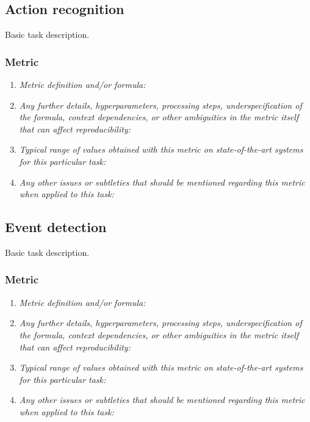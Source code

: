 \documentclass[a4paper,11pt]{article}
\begin{document}
    \subsection{Action recognition}
        Basic task description.
        \subsubsection{Metric}
            \begin{enumerate}[label=\alph*.]
                \item \textit{Metric definition and/or formula:}
                \bigskip
                \item \textit{Any further details, hyperparameters, processing steps, underspecification of the formula, context dependencies, or other ambiguities in the metric itself that can affect reproducibility:}
                \bigskip
                \item \textit{Typical range of values obtained with this metric on state-of-the-art systems for this particular task:}
                \bigskip
                \item \textit{Any other issues or subtleties that should be mentioned regarding this metric when applied to this task:}
                \bigskip
            \end{enumerate}

    \subsection{Event detection} \label{event_detection}
        Basic task description.
        \subsubsection{Metric}
            \begin{enumerate}[label=\alph*.]
                \item \textit{Metric definition and/or formula:}
                \bigskip
                \item \textit{Any further details, hyperparameters, processing steps, underspecification of the formula, context dependencies, or other ambiguities in the metric itself that can affect reproducibility:}
                \bigskip
                \item \textit{Typical range of values obtained with this metric on state-of-the-art systems for this particular task:}
                \bigskip
                \item \textit{Any other issues or subtleties that should be mentioned regarding this metric when applied to this task:}
                \bigskip
            \end{enumerate}
\end{document}

